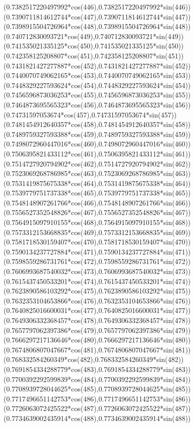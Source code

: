 {({0.7382517220497992*cos(446)},{0.7382517220497992*sin(446)})
({0.7390711814612744*cos(447)},{0.7390711814612744*sin(447)})
({0.7398915504726964*cos(448)},{0.7398915504726964*sin(448)})
({0.740712830093721*cos(449)},{0.740712830093721*sin(449)})
({0.741535021335125*cos(450)},{0.741535021335125*sin(450)})
({0.742358125208807*cos(451)},{0.742358125208807*sin(451)})
({0.7431821427277887*cos(452)},{0.7431821427277887*sin(452)})
({0.7440070749062165*cos(453)},{0.7440070749062165*sin(453)})
({0.7448329227593624*cos(454)},{0.7448329227593624*sin(454)})
({0.7456596873036253*cos(455)},{0.7456596873036253*sin(455)})
({0.7464873695565323*cos(456)},{0.7464873695565323*sin(456)})
({0.74731597053674*cos(457)},{0.74731597053674*sin(457)})
({0.7481454912640357*cos(458)},{0.7481454912640357*sin(458)})
({0.7489759327593388*cos(459)},{0.7489759327593388*sin(459)})
({0.7498072960447016*cos(460)},{0.7498072960447016*sin(460)})
({0.7506395821433112*cos(461)},{0.7506395821433112*sin(461)})
({0.7514727920794902*cos(462)},{0.7514727920794902*sin(462)})
({0.7523069268786985*cos(463)},{0.7523069268786985*sin(463)})
({0.7531419875675338*cos(464)},{0.7531419875675338*sin(464)})
({0.7539779751737338*cos(465)},{0.7539779751737338*sin(465)})
({0.7548148907261766*cos(466)},{0.7548148907261766*sin(466)})
({0.7556527352548826*cos(467)},{0.7556527352548826*sin(467)})
({0.7564915097910155*cos(468)},{0.7564915097910155*sin(468)})
({0.7573312153668835*cos(469)},{0.7573312153668835*sin(469)})
({0.7581718530159407*cos(470)},{0.7581718530159407*sin(470)})
({0.7590134237727884*cos(471)},{0.7590134237727884*sin(471)})
({0.7598559286731761*cos(472)},{0.7598559286731761*sin(472)})
({0.7606993687540032*cos(473)},{0.7606993687540032*sin(473)})
({0.7615437450533201*cos(474)},{0.7615437450533201*sin(474)})
({0.7623890586103292*cos(475)},{0.7623890586103292*sin(475)})
({0.7632353104653866*cos(476)},{0.7632353104653866*sin(476)})
({0.7640825016600031*cos(477)},{0.7640825016600031*sin(477)})
({0.7649306332368457*cos(478)},{0.7649306332368457*sin(478)})
({0.7657797062397386*cos(479)},{0.7657797062397386*sin(479)})
({0.7666297217136646*cos(480)},{0.7666297217136646*sin(480)})
({0.7674806807047667*cos(481)},{0.7674806807047667*sin(481)})
({0.768332584260349*cos(482)},{0.768332584260349*sin(482)})
({0.7691854334288779*cos(483)},{0.7691854334288779*sin(483)})
({0.7700392292599839*cos(484)},{0.7700392292599839*sin(484)})
({0.7708939728044625*cos(485)},{0.7708939728044625*sin(485)})
({0.7717496651142753*cos(486)},{0.7717496651142753*sin(486)})
({0.7726063072425522*cos(487)},{0.7726063072425522*sin(487)})
({0.7734639002435914*cos(488)},{0.7734639002435914*sin(488)})
}
